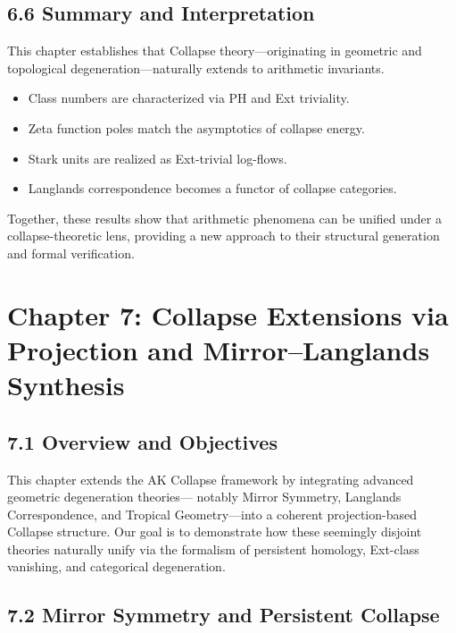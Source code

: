 \documentclass[11pt]{article}
\begin{document}
\subsection*{6.6 Summary and Interpretation}

This chapter establishes that Collapse theory—originating in geometric and topological degeneration—naturally extends to arithmetic invariants.

\begin{itemize}
  \item Class numbers are characterized via PH and Ext triviality.
  \item Zeta function poles match the asymptotics of collapse energy.
  \item Stark units are realized as Ext-trivial log-flows.
  \item Langlands correspondence becomes a functor of collapse categories.
\end{itemize}

Together, these results show that arithmetic phenomena can be unified under a collapse-theoretic lens, providing a new approach to their structural generation and formal verification.



\section*{Chapter 7: Collapse Extensions via Projection and Mirror–Langlands Synthesis}

\subsection*{7.1 Overview and Objectives}

This chapter extends the AK Collapse framework by integrating advanced geometric degeneration theories—  
notably Mirror Symmetry, Langlands Correspondence, and Tropical Geometry—into a coherent projection-based Collapse structure.  
Our goal is to demonstrate how these seemingly disjoint theories naturally unify via the formalism of persistent homology,  
Ext-class vanishing, and categorical degeneration.

\subsection*{7.2 Mirror Symmetry and Persistent Collapse}
\end{document}
